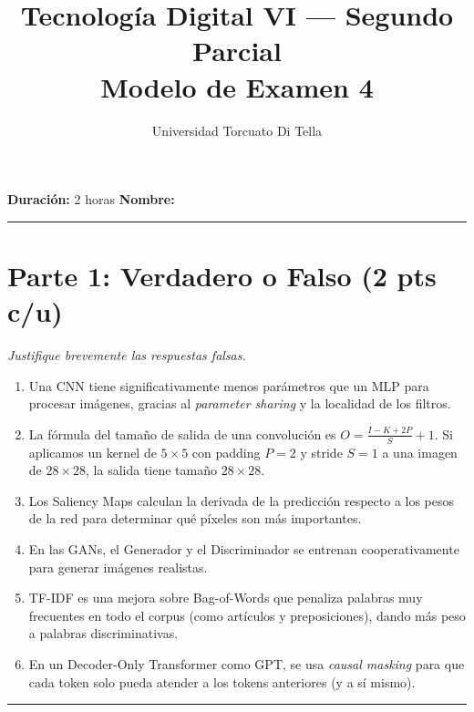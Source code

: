 \documentclass[12pt,a4paper]{article}
\title{\textbf{Tecnología Digital VI --- Segundo Parcial} \\ Modelo de Examen 4}
\author{Universidad Torcuato Di Tella}
\date{}
\begin{document}
\maketitle
\noindent\textbf{Duración:} 2 horas \hfill \textbf{Nombre:} \hrulefill

\vspace{0.5cm}
\hrule
\vspace{0.5cm}

\section*{Parte 1: Verdadero o Falso (2 pts c/u)}
\textit{Justifique brevemente las respuestas falsas.}

\begin{enumerate}[label=\alph*)]
    \item Una CNN tiene significativamente menos parámetros que un MLP para procesar imágenes, gracias al \textit{parameter sharing} y la localidad de los filtros.

    \item La fórmula del tamaño de salida de una convolución es $O = \frac{I - K + 2P}{S} + 1$. Si aplicamos un kernel de $5 \times 5$ con padding $P=2$ y stride $S=1$ a una imagen de $28 \times 28$, la salida tiene tamaño $28 \times 28$.

    \item Los Saliency Maps calculan la derivada de la predicción respecto a los pesos de la red para determinar qué píxeles son más importantes.

    \item En las GANs, el Generador y el Discriminador se entrenan cooperativamente para generar imágenes realistas.

    \item TF-IDF es una mejora sobre Bag-of-Words que penaliza palabras muy frecuentes en todo el corpus (como artículos y preposiciones), dando más peso a palabras discriminativas.

    \item En un Decoder-Only Transformer como GPT, se usa \textit{causal masking} para que cada token solo pueda atender a los tokens anteriores (y a sí mismo).
\end{enumerate}

\vspace{0.5cm}
\hrule
\vspace{0.5cm}

\end{document}

